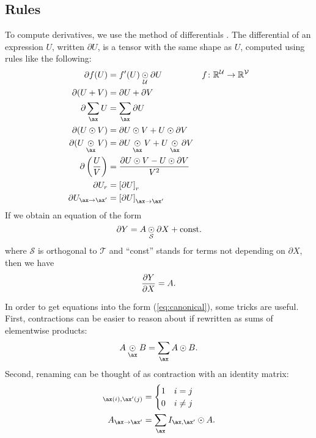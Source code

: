 \subsection{Rules}

To compute derivatives, we use the method of differentials \citep{magnus+neudecker:1985}. The differential of an expression $U$, written $\partial U$, is a tensor with the same shape as $U$, computed using rules like the following:
\begin{align*}
  \partial f(U) &= f'(U) \ndot{\mathcal{U}} \partial U && f \colon \reals^\mathcal{U} \rightarrow \reals^{\mathcal{V}} \\
  \partial (U + V) &= \partial U + \partial V \\
  \partial \nsum{\ax} U &= \nsum{\ax} \partial U \\
  \partial (U \odot V) &= \partial U \odot V + U \odot \partial V \\
  \partial (U \ndot{\ax} V) &= \partial U \ndot{\ax} V + U \ndot{\ax} \partial V \\
  \partial \left(\frac{U}{V}\right) &= \frac{\partial U \odot V - U \odot \partial V}{V^2} \\
  \partial U_r &= \left[\partial U\right]_r \\
  \partial U_{\ax\rightarrow\ax'} &= \left[\partial U\right]_{\ax\rightarrow\ax'}
\end{align*}
If we obtain an equation of the form
\begin{equation}
  \partial Y = A \mathbin{\underset{\substack{\mathcal{S}}}{\odot}} \partial X + \text{const.}
  \label{eq:canonical}
\end{equation}
where $\mathcal{S}$ is orthogonal to $\mathcal{T}$ and ``const'' stands for terms not depending on $\partial X$, then we have
\begin{equation*}
  \frac{\partial Y}{\partial X} = A.
\end{equation*}

In order to get equations into the form (\ref{eq:canonical}), some tricks are useful. First, contractions can be easier to reason about if rewritten as sums of elementwise products:
\[ A \ndot{\ax} B = \nsum{\ax} A \odot B. \]
Second, renaming can be thought of as contraction with an identity matrix:
\begin{align*}
[I_{\ax,\ax'}]_{\ax(i),\ax'(j)} &= \begin{cases} 1 & i = j \\ 0 & i \neq j \end{cases} \\
A_{\ax\rightarrow\ax'} &= \nsum{\ax} I_{\ax,\ax'} \odot A.
\end{align*}

